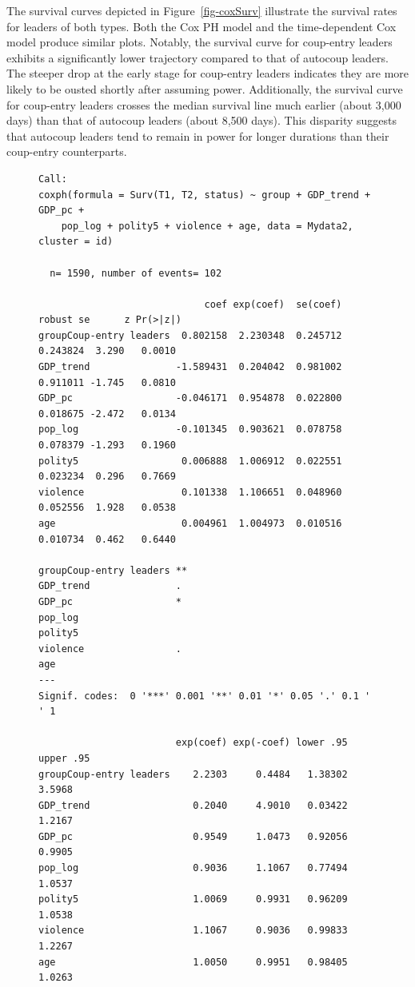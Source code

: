 \documentclass[
  12pt,
]{report}
\begin{document}
The survival curves depicted in Figure~\ref{fig-coxSurv} illustrate the
survival rates for leaders of both types. Both the Cox PH model and the
time-dependent Cox model produce similar plots. Notably, the survival
curve for coup-entry leaders exhibits a significantly lower trajectory
compared to that of autocoup leaders. The steeper drop at the early
stage for coup-entry leaders indicates they are more likely to be ousted
shortly after assuming power. Additionally, the survival curve for
coup-entry leaders crosses the median survival line much earlier (about
3,000 days) than that of autocoup leaders (about 8,500 days). This
disparity suggests that autocoup leaders tend to remain in power for
longer durations than their coup-entry counterparts.

\begin{figure}

\begin{minipage}{0.50\linewidth}

\begin{verbatim}
Call:
coxph(formula = Surv(T1, T2, status) ~ group + GDP_trend + GDP_pc + 
    pop_log + polity5 + violence + age, data = Mydata2, cluster = id)

  n= 1590, number of events= 102 

                             coef exp(coef)  se(coef) robust se      z Pr(>|z|)
groupCoup-entry leaders  0.802158  2.230348  0.245712  0.243824  3.290   0.0010
GDP_trend               -1.589431  0.204042  0.981002  0.911011 -1.745   0.0810
GDP_pc                  -0.046171  0.954878  0.022800  0.018675 -2.472   0.0134
pop_log                 -0.101345  0.903621  0.078758  0.078379 -1.293   0.1960
polity5                  0.006888  1.006912  0.022551  0.023234  0.296   0.7669
violence                 0.101338  1.106651  0.048960  0.052556  1.928   0.0538
age                      0.004961  1.004973  0.010516  0.010734  0.462   0.6440
                          
groupCoup-entry leaders **
GDP_trend               . 
GDP_pc                  * 
pop_log                   
polity5                   
violence                . 
age                       
---
Signif. codes:  0 '***' 0.001 '**' 0.01 '*' 0.05 '.' 0.1 ' ' 1

                        exp(coef) exp(-coef) lower .95 upper .95
groupCoup-entry leaders    2.2303     0.4484   1.38302    3.5968
GDP_trend                  0.2040     4.9010   0.03422    1.2167
GDP_pc                     0.9549     1.0473   0.92056    0.9905
pop_log                    0.9036     1.1067   0.77494    1.0537
polity5                    1.0069     0.9931   0.96209    1.0538
violence                   1.1067     0.9036   0.99833    1.2267
age                        1.0050     0.9951   0.98405    1.0263


\end{verbatim}
\end{minipage}
\end{figure}
\end{document}
